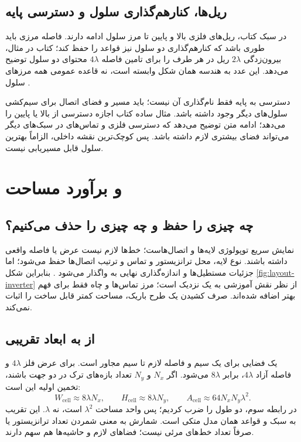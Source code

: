 \subsection{ریل‌ها، کنارهم‌گذاری سلول و دسترسی پایه}
در سبک کتاب، ریل‌های فلزی بالا و پایین تا مرز سلول ادامه دارند.
فاصله مرزی باید طوری باشد که کنارهم‌گذاری دو سلول نیز قواعد را حفظ کند؛
کتاب در مثال، بیرون‌زدگی \(2\lambda\) ریل در هر طرف را برای تامین فاصله
\(4\lambda\) محتوای دو سلول توضیح می‌دهد.
این عدد به هندسه همان شکل وابسته است، نه قاعده عمومی همه مرزهای سلول
\cite[صفحه چاپی ۲۷]{weste}.

دسترسی به پایه فقط نام‌گذاری آن نیست؛ باید مسیر و فضای اتصال برای سیم‌کشی
سلول‌های دیگر وجود داشته باشد. مثال ساده کتاب اجازه دسترسی  از بالا
یا پایین را می‌دهد؛ ادامه متن توضیح می‌دهد که دسترسی فلزی و تماس‌های
 در سبک‌های دیگر می‌تواند فضای بیشتری لازم داشته باشد.
پس کوچک‌ترین نقشه داخلی، الزاماً بهترین سلول قابل مسیریابی نیست.

\section{ و برآورد مساحت}
\label{sec:layout-stick}
\subsection{چه چیزی را حفظ و چه چیزی را حذف می‌کنیم؟}
 نمایش سریع توپولوژی لایه‌ها و اتصال‌هاست؛
خط‌ها لازم نیست عرض یا فاصله واقعی داشته باشند.
نوع لایه، محل ترانزیستور و تماس و ترتیب اتصال‌ها حفظ می‌شود؛
اما جزئیات مستطیل‌ها و اندازه‌گذاری نهایی به  واگذار می‌شود
\cite[بخش ]{weste}.
بنابراین شکل \ref{fig:layout-inverter} از نظر نقش آموزشی به یک 
نزدیک است؛ مرز تماس‌ها و چاه فقط برای فهم بهتر اضافه شده‌اند.
صرف کشیدن یک طرح باریک، مساحت کمتر قابل ساخت را اثبات نمی‌کند.

\subsection{از  به ابعاد تقریبی}
یک  فضایی برای یک سیم و فاصله لازم تا سیم مجاور است.
برای عرض فلز \(4\lambda\) و فاصله آزاد \(4\lambda\)،
 برابر \(8\lambda\) می‌شود.
اگر \(N_x\) و \(N_y\) تعداد بازه‌های ترک در دو جهت باشند، تخمین اولیه این است:
\begin{equation}\label{eq:layout-area}
W_{\mathrm{cell}}\approx8\lambda N_x,\qquad
H_{\mathrm{cell}}\approx8\lambda N_y,\qquad
A_{\mathrm{cell}}\approx64N_xN_y\lambda^2.
\end{equation}
در رابطه سوم، دو طول را ضرب کردیم؛ پس واحد مساحت \(\lambda^2\) است، نه
\(\lambda\). این تقریب به سبک و قواعد همان مدل متکی است.
شمارش  به معنی شمردن تعداد ترانزیستور یا صرفاً تعداد خط‌های مرئی نیست؛
فضاهای لازم و حاشیه‌ها هم سهم دارند.

